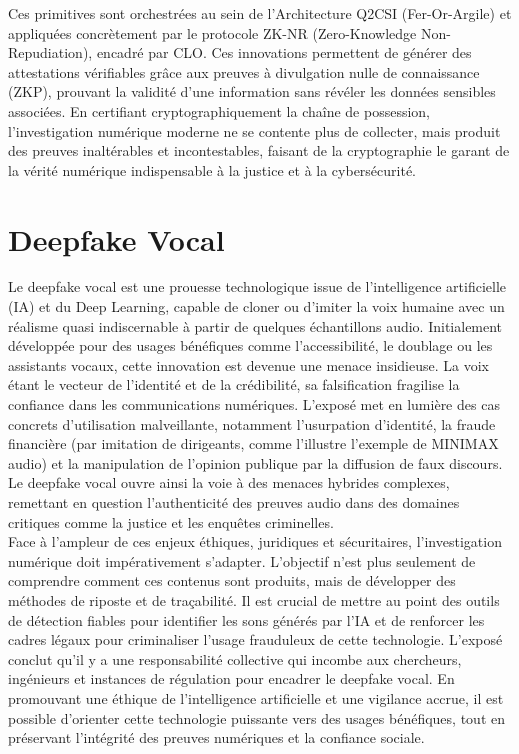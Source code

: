 \documentclass[12pt, openany]{report}
\begin{document}
Ces primitives sont orchestrées au sein de l'Architecture Q2CSI (Fer-Or-Argile) et appliquées concrètement par le protocole ZK-NR (Zero-Knowledge Non-Repudiation), encadré par CLO. Ces innovations permettent de générer des attestations vérifiables grâce aux preuves à divulgation nulle de connaissance (ZKP), prouvant la validité d'une information sans révéler les données sensibles associées. En certifiant cryptographiquement la chaîne de possession, l'investigation numérique moderne ne se contente plus de collecter, mais produit des preuves inaltérables et incontestables, faisant de la cryptographie le garant de la vérité numérique indispensable à la justice et à la cybersécurité.
\newpage
\section{Deepfake Vocal}
Le deepfake vocal est une prouesse technologique issue de l'intelligence artificielle (IA) et du Deep Learning, capable de cloner ou d'imiter la voix humaine avec un réalisme quasi indiscernable à partir de quelques échantillons audio. Initialement développée pour des usages bénéfiques comme l'accessibilité, le doublage ou les assistants vocaux, cette innovation est devenue une menace insidieuse. La voix étant le vecteur de l'identité et de la crédibilité, sa falsification fragilise la confiance dans les communications numériques. L'exposé met en lumière des cas concrets d'utilisation malveillante, notamment l'usurpation d'identité, la fraude financière (par imitation de dirigeants, comme l'illustre l'exemple de MINIMAX audio) et la manipulation de l'opinion publique par la diffusion de faux discours. Le deepfake vocal ouvre ainsi la voie à des menaces hybrides complexes, remettant en question l'authenticité des preuves audio dans des domaines critiques comme la justice et les enquêtes criminelles. \\
Face à l'ampleur de ces enjeux éthiques, juridiques et sécuritaires, l'investigation numérique doit impérativement s'adapter. L'objectif n'est plus seulement de comprendre comment ces contenus sont produits, mais de développer des méthodes de riposte et de traçabilité. Il est crucial de mettre au point des outils de détection fiables pour identifier les sons générés par l'IA et de renforcer les cadres légaux pour criminaliser l'usage frauduleux de cette technologie. L'exposé conclut qu'il y a une responsabilité collective qui incombe aux chercheurs, ingénieurs et instances de régulation pour encadrer le deepfake vocal. En promouvant une éthique de l'intelligence artificielle et une vigilance accrue, il est possible d'orienter cette technologie puissante vers des usages bénéfiques, tout en préservant l'intégrité des preuves numériques et la confiance sociale.
\newpage
\end{document}
